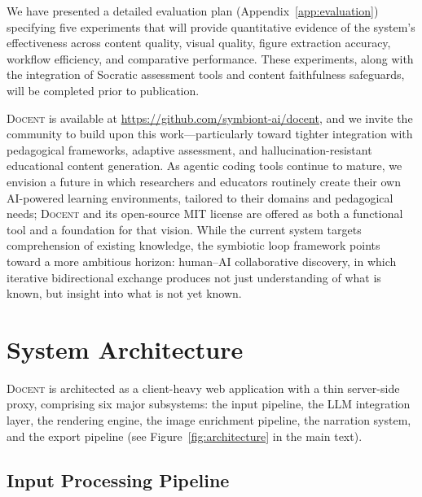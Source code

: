 \documentclass[11pt,a4paper]{article}
\newcommand{\system}{\textsc{Docent}\xspace}
\begin{document}
We have presented a detailed evaluation plan (Appendix~\ref{app:evaluation}) specifying five experiments that will provide quantitative evidence of the system's effectiveness across content quality, visual quality, figure extraction accuracy, workflow efficiency, and comparative performance.
These experiments, along with the integration of Socratic assessment tools and content faithfulness safeguards, will be completed prior to publication.

\system is available at \url{https://github.com/symbiont-ai/docent}, and we invite the community to build upon this work---particularly toward tighter integration with pedagogical frameworks, adaptive assessment, and hallucination-resistant educational content generation.
As agentic coding tools continue to mature, we envision a future in which researchers and educators routinely create their own AI-powered learning environments, tailored to their domains and pedagogical needs; \system and its open-source MIT license are offered as both a functional tool and a foundation for that vision.
While the current system targets comprehension of existing knowledge, the symbiotic loop framework points toward a more ambitious horizon: human--AI collaborative discovery, in which iterative bidirectional exchange produces not just understanding of what is known, but insight into what is not yet known.


\clearpage



\appendix

\section{System Architecture}
\label{app:architecture}

\system is architected as a client-heavy web application with a thin server-side proxy, comprising six major subsystems: the input pipeline, the LLM integration layer, the rendering engine, the image enrichment pipeline, the narration system, and the export pipeline (see Figure~\ref{fig:architecture} in the main text).

\subsection{Input Processing Pipeline}
\end{document}
